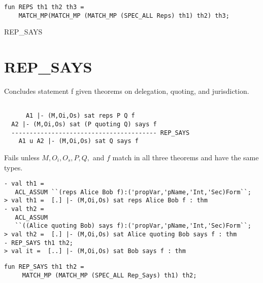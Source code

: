 \IMPLEMENTATION
\begin{holboxed}
\begin{verbatim}
fun REPS th1 th2 th3 = 
    MATCH_MP(MATCH_MP (MATCH_MP (SPEC_ALL Reps) th1) th2) th3;
\end{verbatim}
\end{holboxed}

\SEEALSO
REP\_SAYS
\ENDDOC

\section{REP\_SAYS}



\egroup

\SYNOPSIS
Concludes statement f given theorems on delegation, quoting, and 
jurisdiction.

\DESCRIBE
\begin{verbatim}

      A1 |- (M,Oi,Os) sat reps P Q f  
  A2 |- (M,Oi,Os) sat (P quoting Q) says f
  ---------------------------------------- REP_SAYS
    A1 u A2 |- (M,Oi,Os) sat Q says f
\end{verbatim}

\FAILURE 
Fails unless $M, O_i, O_s, P, Q,$ and $f$ match in all three
theorems and have the same types.

\EXAMPLE

\begin{holboxed}
\begin{verbatim}
- val th1 = 
   ACL_ASSUM ``(reps Alice Bob f):('propVar,'pName,'Int,'Sec)Form``;
> val th1 =  [.] |- (M,Oi,Os) sat reps Alice Bob f : thm
- val th2 = 
   ACL_ASSUM 
   ``((Alice quoting Bob) says f):('propVar,'pName,'Int,'Sec)Form``;
> val th2 =  [.] |- (M,Oi,Os) sat Alice quoting Bob says f : thm
- REP_SAYS th1 th2;
> val it =  [..] |- (M,Oi,Os) sat Bob says f : thm
\end{verbatim}
\end{holboxed}
\IMPLEMENTATION
\begin{holboxed}
\begin{verbatim}
fun REP_SAYS th1 th2 = 
     MATCH_MP (MATCH_MP (SPEC_ALL Rep_Says) th1) th2;
\end{verbatim}
\end{holboxed}

